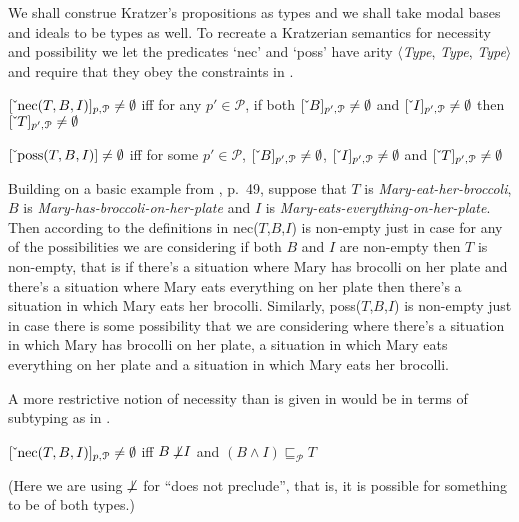 We shall construe Kratzer's propositions as types and we shall take
modal bases and ideals to be types as well.  To recreate a Kratzerian
semantics for necessity and possibility we let the predicates `nec'
and `poss' have arity $\langle$\textit{Type}, \textit{Type},
\textit{Type}$\rangle$ and require that they obey the constraints in
\nexteg{}.
\begin{ex} 
\begin{subex} 
 
\item $[\ \!\check{}\ \!\text{nec}(T,B,I)]_{p,\mathcal{P}} \not=\emptyset$ iff
  for any $p'\in\mathcal{P}$, if both $[\ \!\check{}\ \!B]_{p',\mathcal{P}}\not=\emptyset$ and $[\ \!\check{}\ \!I]_{p',\mathcal{P}}\not=\emptyset$ then  $[\ \!\check{}\ \!T]_{p',\mathcal{P}}\not=\emptyset$
 
\item $[\ \!\check{}\ \!\text{poss}(T,B,I)] \not=\emptyset$ iff for some $p'\in\mathcal{P}$, $[\ \!\check{}\ \!B]_{p',\mathcal{P}}\not=\emptyset$, $[\ \!\check{}\ \!I]_{p',\mathcal{P}}\not=\emptyset$ and
    $[\ \!\check{}\ \!T]_{p',\mathcal{P}}\not=\emptyset$  
 
\end{subex} 
\label{ex:necpossTBI}   
\end{ex}
Building on a basic example from \citealp{Portner2009}, p.~49, suppose
that $T$ is \textit{Mary-eat-her-broccoli}, $B$ is
\textit{Mary-has-broccoli-on-her-plate} and $I$ is
\textit{Mary-eats-everything-on-her-plate}.  Then according to the
definitions in \preveg{} nec($T$,$B$,$I$) is non-empty just in case
for any of the possibilities we are considering if both $B$ and  $I$ are
non-empty then $T$ is non-empty, that is if there's a situation where
Mary has brocolli on her plate and there's a situation where Mary eats everything on her plate
then there's a situation in which Mary eats her brocolli.  Similarly,
poss($T$,$B$,$I$) is non-empty just in case there is some possibility
that we are considering where there's a situation in which Mary has
brocolli on her plate, a situation in which Mary
eats everything on her plate and a situation in which Mary eats her brocolli.
 
A more restrictive notion of necessity than is given in 
would be in terms of subtyping as in \nexteg{}.
\begin{ex} 
$[\ \!\check{}\ \!\text{nec}(T,B,I)]_{p,\mathcal{P}} \not=\emptyset$ iff
$B\not\!\!\bot I$ and $(B\wedge I)
\sqsubseteq_{\mathcal{P}} T$ 
\end{ex}
(Here we are using $\not\!\!\bot$ for ``does not preclude'', that is,
it is possible for something to be of both types.)
 
